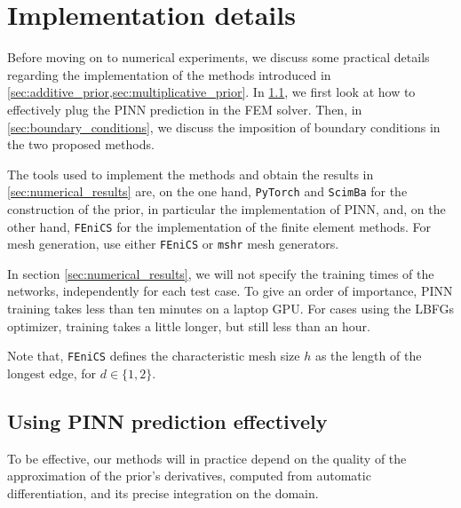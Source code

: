 \section{Implementation details}\label{sec:implementation_details}

Before moving on to numerical experiments,
we discuss some practical details
regarding the implementation of
the methods introduced in \cref{sec:additive_prior,sec:multiplicative_prior}.
In \cref{sec:using_PINN}, we first look at how to effectively plug the PINN prediction in the FEM solver.
Then, in \cref{sec:boundary_conditions}, we discuss the imposition of boundary conditions in the two proposed methods. %


The tools used to implement the methods and obtain the results in \cref{sec:numerical_results} are, on the one hand, \texttt{PyTorch} \cite{paszke2019pytorchimperativestylehighperformance} and \texttt{ScimBa} for the construction of the prior, in particular the implementation of PINN, and, on the other hand, \texttt{FEniCS} for the implementation of the finite element methods. For mesh generation, use either \texttt{FEniCS} or \texttt{mshr} mesh generators.

\begin{remark}
    In section \cref{sec:numerical_results}, we will not specify the training times of the networks, independently for each test case. To give an order of importance, PINN training takes less than ten minutes on a laptop GPU. For cases using the LBFGs optimizer, training takes a little longer, but still less than an hour.
\end{remark}

\begin{remark}
    Note that, \texttt{FEniCS} defines the characteristic mesh size $h$ as the length of the longest edge, for $d\in\{1,2\}$.
\end{remark}

\subsection{Using PINN prediction effectively}\label{sec:using_PINN}

To be effective, our methods will in practice depend on the quality of the approximation of the prior's derivatives, computed from automatic differentiation, and its precise integration on the domain.

